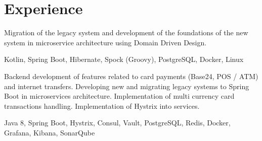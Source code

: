 \documentclass[]{deedy-resume-openfont}
\begin{document}
\begin{minipage}[t]{0.66\textwidth} 


\section{Experience}

\sectionsep

Migration of the legacy system and development of the foundations of the new system in microservice architecture using Domain Driven Design.

 Kotlin, Spring Boot, Hibernate, Spock (Groovy), PostgreSQL, Docker, Linux
\sectionsep

Backend development of features related to card payments (Base24, POS / ATM) and internet transfers. 
Developing new and migrating legacy systems to Spring Boot in microservices architecture.
Implementation of multi currency card transactions handling. 
Implementation of Hystrix into services.

 Java 8, Spring Boot, Hystrix, Consul, Vault, PostgreSQL, Redis, Docker, Grafana, Kibana, SonarQube
\sectionsep


\end{minipage}
\end{document}
